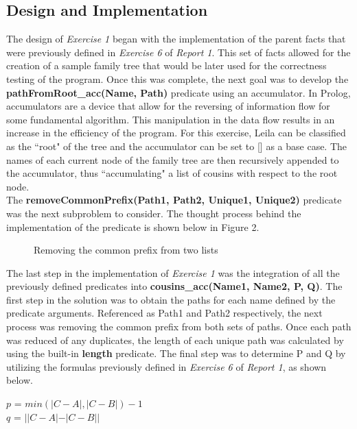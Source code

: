 \documentclass[11pt]{article}
\newcommand{\forceindent}{\leavevmode{\parindent=1em\indent}}
\begin{document}
 	\subsection{Design and Implementation}
\forceindent The design of \emph{Exercise 1} began with the implementation of the parent facts that were previously defined in \emph{Exercise 6} of \emph{Report 1}. This set of facts allowed for the creation of a sample family tree that would be later used for the correctness testing of the program. Once this was complete, the next goal was to develop the \textbf{pathFromRoot\_acc(Name, Path)} predicate using an accumulator. In Prolog, accumulators are a device that allow for the reversing of information flow for some fundamental algorithm. This manipulation in the data flow results in an increase in the efficiency of the program. For this exercise, Leila can be classified as the ``root" of the tree and the accumulator can be set to [] as a base case. The names of each current node of the family tree are then recursively appended to the accumulator, thus ``accumulating" a list of cousins with respect to the root node. \\

The \textbf{removeCommonPrefix(Path1, Path2, Unique1, Unique2)} predicate was the next subproblem to consider. The thought process behind the implementation of the predicate is shown below in Figure 2. 

\begin{figure}[h!]
  \centering
  \vspace{60 mm}
  \caption{Removing the common prefix from two lists}
  \end{figure}
  \vspace{20 mm}
The last step in the implementation of \emph{Exercise 1} was the integration of all the previously defined predicates into \textbf{cousins\_acc(Name1, Name2, P, Q)}. The first step in the solution was to obtain the paths for each name defined by the predicate arguments. Referenced as Path1 and Path2 respectively, the next process was removing the common prefix from both sets of paths. Once each path was reduced of any duplicates, the length of each unique path was calculated by using the built-in \textbf{length} predicate. The final step was to determine P and Q by utilizing the formulas previously defined in \emph{Exercise 6} of \emph{Report 1}, as shown below.  
\begin{center}
$p$ = $min (|C-A|, |C-B|) - 1$ \\
$q$ = $||C-A|-|C-B||$ \\
\end{center}
\end{document}
